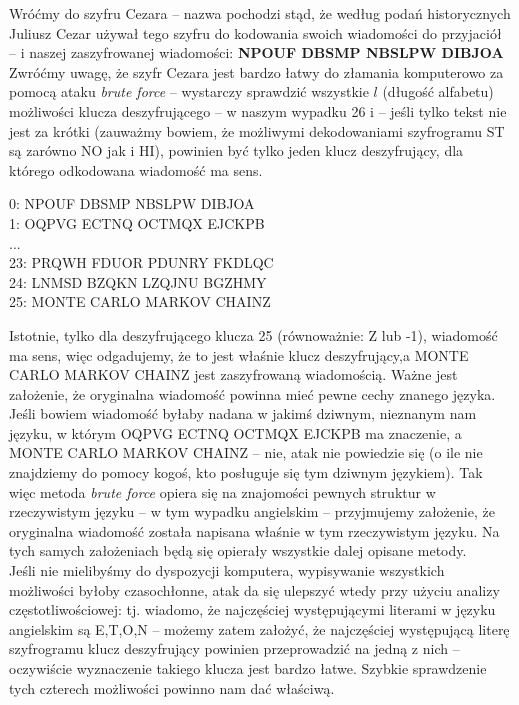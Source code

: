 \documentclass[a4paper]{article}
\theoremstyle{defn}
\theoremstyle{theorem}
\theoremstyle{lemma}
\theoremstyle{cor}
\theoremstyle{fact}
\begin{document}
Wróćmy do szyfru Cezara – nazwa pochodzi stąd, że według podań historycznych Juliusz Cezar używał tego szyfru do kodowania swoich wiadomości do przyjaciół \cite{caesar} – i naszej zaszyfrowanej wiadomości: \textbf{NPOUF DBSMP NBSLPW DIBJOA} Zwróćmy uwagę, że szyfr Cezara jest bardzo łatwy do złamania komputerowo za pomocą ataku \textit{brute force} – wystarczy sprawdzić wszystkie $l$ (długość alfabetu) możliwości klucza deszyfrującego – w naszym wypadku 26 i – jeśli tylko tekst nie jest za krótki (zauważmy bowiem, że możliwymi dekodowaniami szyfrogramu ST są zarówno NO jak i HI), powinien być tylko jeden klucz deszyfrujący, dla którego odkodowana wiadomość ma sens.
\begin{center}
0:  NPOUF DBSMP NBSLPW DIBJOA \\
1:  OQPVG ECTNQ OCTMQX EJCKPB \\
...
\\
23: PRQWH FDUOR PDUNRY FKDLQC \\
24: LNMSD BZQKN LZQJNU BGZHMY \\
25: MONTE CARLO MARKOV CHAINZ \\
\end{center}
Istotnie, tylko dla deszyfrującego klucza 25 (równoważnie: Z lub -1), wiadomość ma sens, więc odgadujemy, że to jest właśnie klucz deszyfrujący,a MONTE CARLO MARKOV CHAINZ jest zaszyfrowaną wiadomością. Ważne jest założenie, że oryginalna wiadomość powinna mieć pewne cechy znanego języka. Jeśli bowiem wiadomość byłaby nadana w jakimś dziwnym, nieznanym nam języku, w którym OQPVG ECTNQ OCTMQX EJCKPB ma znaczenie, a MONTE CARLO MARKOV CHAINZ – nie, atak nie powiedzie się (o ile nie znajdziemy do pomocy kogoś, kto posługuje się tym dziwnym językiem). Tak więc metoda \textit{brute force} opiera się na znajomości pewnych struktur w rzeczywistym języku – w tym wypadku angielskim – przyjmujemy założenie, że oryginalna wiadomość została napisana właśnie w tym rzeczywistym języku. Na tych samych założeniach będą się opierały wszystkie dalej opisane metody.\\
Jeśli nie mielibyśmy do dyspozycji komputera, wypisywanie wszystkich możliwości byłoby czasochłonne, atak da się ulepszyć wtedy przy użyciu analizy częstotliwościowej: tj. wiadomo, że najczęściej występującymi literami w języku angielskim są E,T,O,N – możemy zatem założyć, że najczęściej występującą literę szyfrogramu klucz deszyfrujący powinien przeprowadzić na jedną z nich – oczywiście wyznaczenie takiego klucza jest bardzo łatwe. Szybkie sprawdzenie tych czterech możliwości powinno nam dać właściwą.
\\
\end{document}

